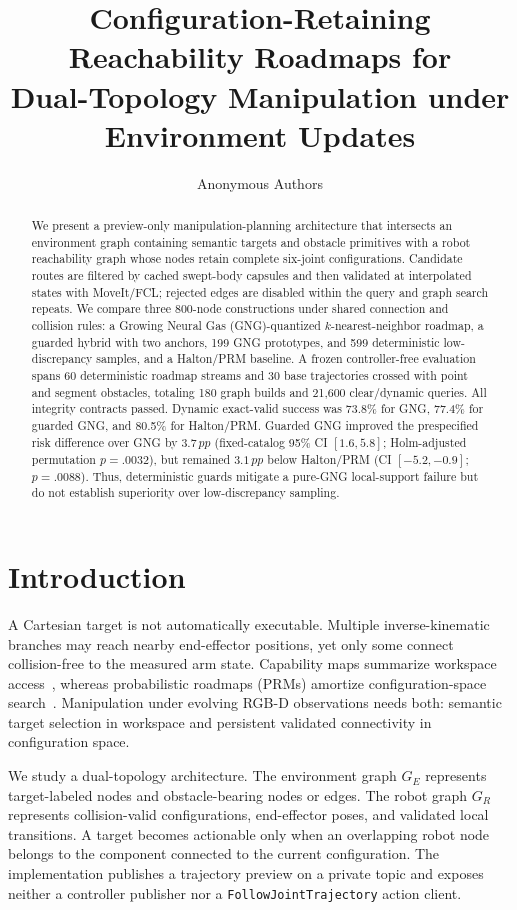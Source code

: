 \documentclass[letterpaper,10pt,conference]{ieeeconf}
\title{\LARGE \bf
Configuration-Retaining Reachability Roadmaps for\\
Dual-Topology Manipulation under Environment Updates
}
\author{Anonymous Authors}
\newcommand{\pp}{\,pp}
\begin{document}
\maketitle
\thispagestyle{empty}
\pagestyle{empty}

\begin{abstract}
We present a preview-only manipulation-planning architecture that intersects an environment graph containing semantic targets and obstacle primitives with a robot reachability graph whose nodes retain complete six-joint configurations. Candidate routes are filtered by cached swept-body capsules and then validated at interpolated states with MoveIt/FCL; rejected edges are disabled within the query and graph search repeats. We compare three 800-node constructions under shared connection and collision rules: a Growing Neural Gas (GNG)-quantized $k$-nearest-neighbor roadmap, a guarded hybrid with two anchors, 199 GNG prototypes, and 599 deterministic low-discrepancy samples, and a Halton/PRM baseline. A frozen controller-free evaluation spans 60 deterministic roadmap streams and 30 base trajectories crossed with point and segment obstacles, totaling 180 graph builds and 21,600 clear/dynamic queries. All integrity contracts passed. Dynamic exact-valid success was 73.8\% for GNG, 77.4\% for guarded GNG, and 80.5\% for Halton/PRM. Guarded GNG improved the prespecified risk difference over GNG by $3.7\pp$ (fixed-catalog 95\% CI $[1.6,5.8]$; Holm-adjusted permutation $p=.0032$), but remained $3.1\pp$ below Halton/PRM (CI $[-5.2,-0.9]$; $p=.0088$). Thus, deterministic guards mitigate a pure-GNG local-support failure but do not establish superiority over low-discrepancy sampling.
\end{abstract}

\section{Introduction}
A Cartesian target is not automatically executable. Multiple inverse-kinematic branches may reach nearby end-effector positions, yet only some connect collision-free to the measured arm state. Capability maps summarize workspace access~\cite{zacharias2007,porges2014}, whereas probabilistic roadmaps (PRMs) amortize configuration-space search~\cite{kavraki1996}. Manipulation under evolving RGB-D observations needs both: semantic target selection in workspace and persistent validated connectivity in configuration space.

We study a dual-topology architecture. The environment graph $G_E$ represents target-labeled nodes and obstacle-bearing nodes or edges. The robot graph $G_R$ represents collision-valid configurations, end-effector poses, and validated local transitions. A target becomes actionable only when an overlapping robot node belongs to the component connected to the current configuration. The implementation publishes a trajectory preview on a private topic and exposes neither a controller publisher nor a \texttt{FollowJointTrajectory} action client.
\end{document}
